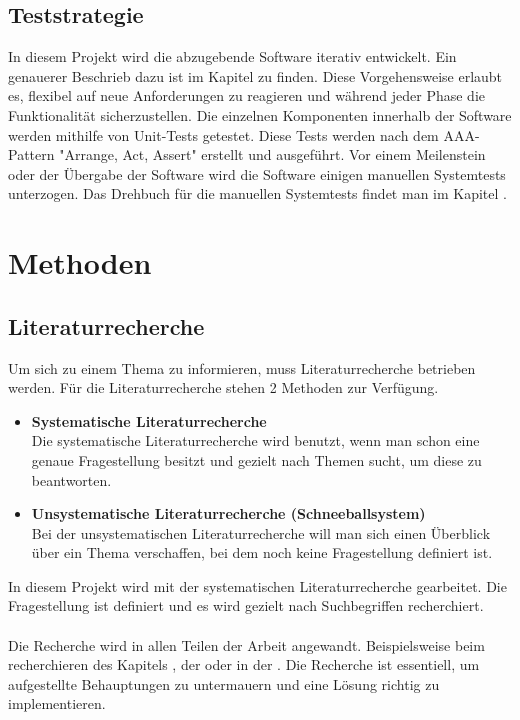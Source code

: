 \documentclass[a4paper, table]{article}
\begin{document}
\subsection{Teststrategie}\label{Teststrategie}
In diesem Projekt wird die abzugebende Software iterativ entwickelt. 
Ein genauerer Beschrieb dazu ist im Kapitel  zu finden.
Diese Vorgehensweise erlaubt es, flexibel auf neue Anforderungen zu reagieren und während jeder Phase die Funktionalität sicherzustellen. 
Die einzelnen Komponenten innerhalb der Software werden mithilfe von Unit-Tests getestet. 
Diese Tests werden nach dem AAA-Pattern "Arrange, Act, Assert" erstellt und ausgeführt.\autocite{noauthor_arrangeactassert_nodate}
Vor einem Meilenstein oder der Übergabe der Software wird die Software einigen manuellen Systemtests unterzogen.
Das Drehbuch für die manuellen Systemtests findet man im Kapitel .

\newpage
\section{Methoden}
\subsection{Literaturrecherche}
Um sich zu einem Thema zu informieren, muss Literaturrecherche betrieben werden. 
Für die Literaturrecherche stehen 2 Methoden zur Verfügung.\autocite{solis_so_2021}
\begin{itemize}
    \item \textbf{Systematische Literaturrecherche}\\
    Die systematische Literaturrecherche wird benutzt, wenn man schon eine genaue Fragestellung besitzt und gezielt nach Themen sucht, um diese zu beantworten.
    \item \textbf{Unsystematische Literaturrecherche (Schneeballsystem)}\\
    Bei der unsystematischen Literaturrecherche will man sich einen Überblick über ein Thema verschaffen, bei dem noch keine Fragestellung definiert ist.
\end{itemize}
In diesem Projekt wird mit der systematischen Literaturrecherche gearbeitet. 
Die Fragestellung ist definiert und es wird gezielt nach Suchbegriffen recherchiert.\\\\
Die Recherche wird in allen Teilen der Arbeit angewandt.
Beispielsweise beim recherchieren des Kapitels , der  oder in der .
Die Recherche ist essentiell, um aufgestellte Behauptungen zu untermauern und eine Lösung richtig zu implementieren.
\end{document}
